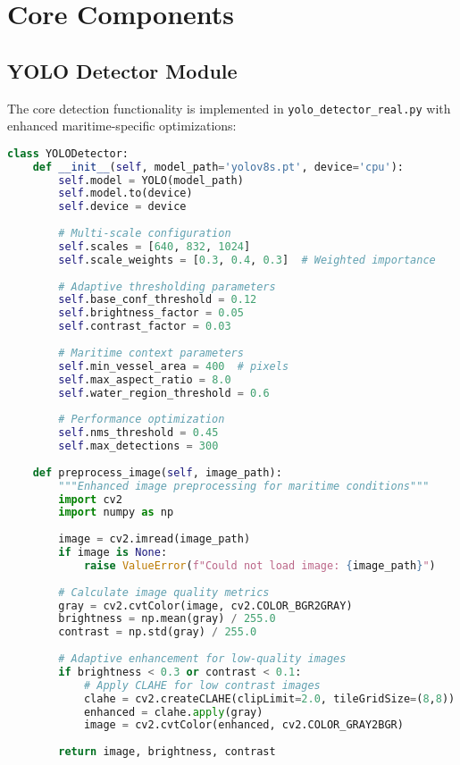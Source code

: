 \documentclass[12pt,a4paper]{report}
\begin{document}
\section{Core Components}

\subsection{YOLO Detector Module}
The core detection functionality is implemented in \texttt{yolo\_detector\_real.py} with enhanced maritime-specific optimizations:

\begin{lstlisting}[language=Python, caption=Enhanced YOLO Detector Initialization]
class YOLODetector:
    def __init__(self, model_path='yolov8s.pt', device='cpu'):
        self.model = YOLO(model_path)
        self.model.to(device)
        self.device = device
        
        # Multi-scale configuration
        self.scales = [640, 832, 1024]
        self.scale_weights = [0.3, 0.4, 0.3]  # Weighted importance
        
        # Adaptive thresholding parameters
        self.base_conf_threshold = 0.12
        self.brightness_factor = 0.05
        self.contrast_factor = 0.03
        
        # Maritime context parameters
        self.min_vessel_area = 400  # pixels
        self.max_aspect_ratio = 8.0
        self.water_region_threshold = 0.6
        
        # Performance optimization
        self.nms_threshold = 0.45
        self.max_detections = 300
        
    def preprocess_image(self, image_path):
        """Enhanced image preprocessing for maritime conditions"""
        import cv2
        import numpy as np
        
        image = cv2.imread(image_path)
        if image is None:
            raise ValueError(f"Could not load image: {image_path}")
            
        # Calculate image quality metrics
        gray = cv2.cvtColor(image, cv2.COLOR_BGR2GRAY)
        brightness = np.mean(gray) / 255.0
        contrast = np.std(gray) / 255.0
        
        # Adaptive enhancement for low-quality images
        if brightness < 0.3 or contrast < 0.1:
            # Apply CLAHE for low contrast images
            clahe = cv2.createCLAHE(clipLimit=2.0, tileGridSize=(8,8))
            enhanced = clahe.apply(gray)
            image = cv2.cvtColor(enhanced, cv2.COLOR_GRAY2BGR)
            
        return image, brightness, contrast
\end{lstlisting}
\end{document}
